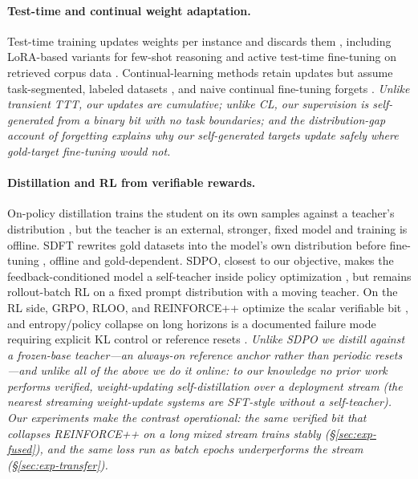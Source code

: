 \paragraph{Test-time and continual weight adaptation.}
Test-time training updates weights per instance and discards them
\citep{sun2020ttt}, including LoRA-based variants for few-shot reasoning
\citep{akyurek2025surprising} and active test-time fine-tuning on retrieved
corpus data \citep{hubotter2025sift}. Continual-learning methods retain updates
but assume task-segmented, labeled datasets \citep{shi2025continual,
parisi2019continual}, and naive continual fine-tuning forgets
\citep{luo2023empirical}. \emph{Unlike transient TTT, our updates are
cumulative; unlike CL, our supervision is self-generated from a binary bit with
no task boundaries; and the distribution-gap account of forgetting
\citep{yang2024selfdistillation} explains why our self-generated targets update
safely where gold-target fine-tuning would not.}

\paragraph{Distillation and RL from verifiable rewards.}
On-policy distillation trains the student on its own samples against a teacher's
distribution \citep{agarwal2024gkd, gu2024minillm, xu2025skd, lu2025onpolicy}
, but the teacher is an external, stronger, fixed model and training is
offline. SDFT rewrites gold datasets into the model's own distribution before
fine-tuning \citep{yang2024selfdistillation}, offline and gold-dependent. SDPO,
closest to our objective, makes the feedback-conditioned model a self-teacher
inside policy optimization \citep{hue2026sdpo}, but remains rollout-batch RL on a fixed prompt distribution with a moving
teacher. On the RL side, GRPO,
RLOO, and REINFORCE++ optimize the scalar verifiable bit
\citep{shao2024deepseekmath, ahmadian2024rloo, hu2025reinforcepp,
ouyang2022instructgpt}, and entropy/policy collapse on long horizons is a
documented failure mode requiring explicit KL control or reference resets
\citep{cui2025entropy, liu2025prorl}. \emph{Unlike SDPO we distill against a
frozen-base teacher---an always-on reference anchor rather than periodic
resets---and unlike all of the above we do it online: to our knowledge no prior
work performs verified, weight-updating self-distillation over a deployment
stream (the nearest streaming weight-update systems are SFT-style without a
self-teacher). Our experiments make the contrast operational: the same verified
bit that collapses REINFORCE++ on a long mixed stream trains \method{} stably
(\S\ref{sec:exp-fused}), and the same loss run as batch epochs underperforms
the stream (\S\ref{sec:exp-transfer}).}
